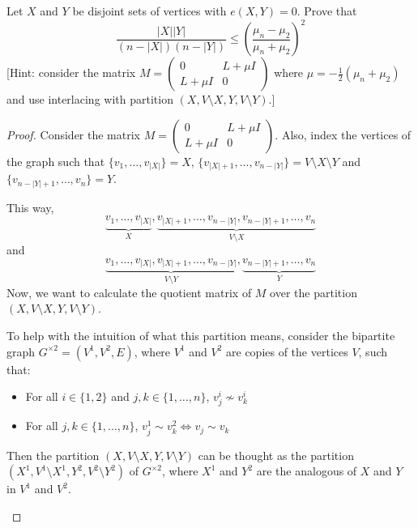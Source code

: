 \begin{problem}
    Let $X$ and $Y$ be disjoint sets of vertices with $e(X,Y) = 0$.
    Prove that
    \[
        \frac{|X| |Y|}{(n - |X|)(n - |Y|)} \leq \left(\frac{\mu_n - \mu_2}{\mu_n + \mu_2}\right)^2
    \]
    [Hint: consider the matrix $M =
    \begin{pmatrix}
        0 & L + \mu I \\
        L + \mu I & 0
    \end{pmatrix}$
    where $\mu = -\frac{1}{2}(\mu_n + \mu_2)$ and use interlacing with partition $(X, V \setminus X, Y, V \setminus Y)$.]
    \begin{sol}
        \begin{proof}
            Consider the matrix $M =
            \begin{pmatrix}
                0 & L + \mu I \\
                L + \mu I & 0
            \end{pmatrix}$.
            Also, index the vertices of the graph such that $\{v_1, \dots, v_{|X|}\} = X$, $\{v_{|X| + 1}, \dots, v_{n - |Y|}\} = V \setminus X \setminus Y$ and $\{v_{n - |Y| + 1}, \dots, v_{n}\} = Y$.

            This way,
            \[
                \underbrace{v_1, \dots, v_{|X|}}_{X}, \underbrace{v_{|X| + 1}, \dots, v_{n - |Y|}, v_{n - |Y| + 1}, \dots, v_{n}}_{V \setminus X}
            \]
            and
            \[
                \underbrace{v_1, \dots, v_{|X|}, v_{|X| + 1}, \dots, v_{n - |Y|}}_{V \setminus Y}, \underbrace{v_{n - |Y| + 1}, \dots, v_{n}}_{Y}
            \]
            Now, we want to calculate the quotient matrix of $M$ over the partition $(X, V \setminus X, Y, V \setminus Y)$.

            \begin{observation}
                To help with the intuition of what this partition means, consider the bipartite graph $G^{\times 2} = (V^1, V^2, E)$, where $V^1$ and $V^2$ are copies of the vertices $V$, such that:
                \begin{itemize}
                    \item For all $i \in \{1 ,2\}$ and $j,k \in \{1, \dots, n\}$, $v^i_j \nsim v^i_k$
                    \item For all $j,k \in \{1, \dots, n\}$, $v^1_j \sim v^2_k \Leftrightarrow v_j \sim v_k$
                \end{itemize}
                Then the partition $(X, V \setminus X, Y, V \setminus Y)$ can be thought as the partition $(X^1, V^1 \setminus X^1, Y^2, V^2 \setminus Y^2)$ of $G^{\times 2}$,
                where $X^1$ and $Y^2$ are the analogous of $X$ and $Y$ in $V^1$ and $V^2$.
            \end{observation}


\end{proof}
\end{sol}
\end{problem}
